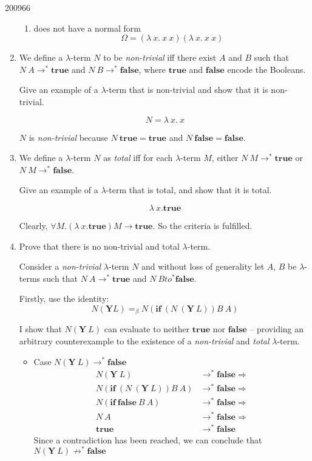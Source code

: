 \documentclass[10pt,\jkfside,a4paper]{article}
\begin{document}
\begin{examquestion}{2009}{6}{6}
\begin{enumerate}
\begin{enumerate}
\item does not have a normal form
\[
\Omega = (\lambda\ x.\ x\ x)(\lambda\ x.\ x\ x)
\]

\end{enumerate}

\item We define a $\lambda$-term $N$ to be \textit{non-trivial} iff there
exist $A$ and $B$ such that $N\ A \to^* \mathbf{true}$ and $N\ B \to^*
\mathbf{false}$, where $\mathbf{true}$ and $\mathbf{false}$ encode the
Booleans.

Give an example of a $\lambda$-term that is non-trivial and show that it is
non-trivial.

\[
N = \lambda\ x.\ x
\]

$N$ is \textit{non-trivial} because $N\ \mathbf{true} = \mathbf{true}$ and
$N\ \mathbf{false} = \mathbf{false}$.

\item We define a $\lambda$-term $N$ as \textit{total} iff for each
$\lambda$-term $M$, either $N\ M \to^* \mathbf{true}$ or $N\ M \to^*
\mathbf{false}$.

Give an example of a $\lambda$-term that is total, and show that it is total.

\[
\lambda\ x. \mathbf{true}
\]

Clearly, $\forall M. (\lambda\ x. \mathbf{true}) M \to \mathbf{true}$. So
the criteria is fulfilled.

\item Prove that there is no non-trivial and total $\lambda$-term.

Consider a \textit{non-trivial} $\lambda$-term $N$ and without loss of
generality let $A$, $B$ be $\lambda$-terms such that $N\ A \to^*
\mathbf{true}$ and $N\ B to^* \mathbf{false}$.

Firstly, use the identity:
\[
N(\mathbf{Y}L) =_{\beta} N(\mathbf{if}\ (N\ (\mathbf{Y}\ L)) B\ A)
\]

I show that $N(\mathbf{Y}\ L)$ can evaluate to neither $\mathbf{true}$ nor
$\mathbf{false}$ -- providing an arbitrary counterexample to the existence
of a \textit{non-trivial} and \textit{total} $\lambda$-term.

\begin{itemize}

\item Case $N(\mathbf{Y}\ L) \to^* \mathbf{false}$
\begin{align*}
N(\mathbf{Y}\ L) &\to^* \mathbf{false} \Longrightarrow \\
N(\mathbf{if}\ (N\ (\mathbf{Y}\ L)) B\ A) &\to^* \mathbf{false}
\Longrightarrow \\
N(\mathbf{if}\ \mathbf{false}\ B\ A) &\to^* \mathbf{false}
\Longrightarrow \\
N\ A &\to^* \mathbf{false} \Longrightarrow \\
\mathbf{true} &\to^* \mathbf{false}
\end{align*}
Since a contradiction has been reached, we can conclude that
$N(\mathbf{Y}\ L) \not\to^* \mathbf{false}$


\end{itemize}
\end{enumerate}
\end{examquestion}
\end{document}
